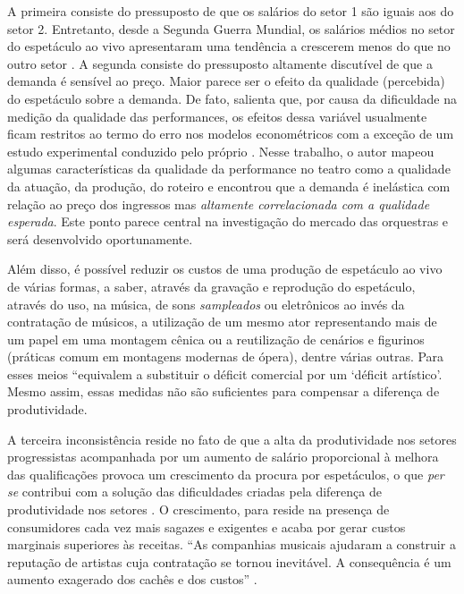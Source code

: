 \documentclass[a4paper, 12pt, openright, oneside, german, french, english, brazil]{abntex2}
\begin{document}
	A primeira consiste do pressuposto de que os salários do setor 1 são iguais aos do setor 2. Entretanto, desde a Segunda Guerra Mundial, os salários médios no setor do espetáculo ao vivo apresentaram uma tendência a crescerem menos do que no outro setor . A segunda consiste do pressuposto altamente discutível de que a demanda é sensível ao preço. Maior parece ser o efeito da qualidade (percebida) do espetáculo sobre a demanda. De fato,  salienta que, por causa da dificuldade na medição da qualidade das performances, os efeitos dessa variável usualmente ficam restritos ao termo do erro nos modelos econométricos com a exceção de um estudo experimental conduzido pelo próprio . Nesse trabalho, o autor mapeou algumas características da qualidade da performance no teatro como a qualidade da atuação, da produção, do roteiro e encontrou que a demanda é inelástica com relação ao preço dos ingressos mas \textit{altamente correlacionada com a qualidade esperada}. Este ponto parece central na investigação do mercado das orquestras e será desenvolvido oportunamente.
	
	Além disso, é possível reduzir os custos de uma produção de espetáculo ao vivo de várias formas, a saber, através da gravação e reprodução do espetáculo, através do uso, na música, de sons \textit{sampleados} ou eletrônicos ao invés da contratação de músicos, a utilização de um mesmo ator representando mais de um papel em uma montagem cênica ou a reutilização de cenários e figurinos (práticas comum em montagens modernas de ópera), dentre várias outras. Para  esses meios ``equivalem a substituir o déficit comercial por um `déficit artístico'. Mesmo assim, essas medidas não são suficientes para compensar a diferença de produtividade. 
	
	A terceira inconsistência reside no fato de que a alta da produtividade nos setores progressistas acompanhada por um aumento de salário proporcional à melhora das qualificações provoca um crescimento da procura por espetáculos, o que \textit{per se} contribui com a solução das dificuldades criadas pela diferença de produtividade nos setores . O crescimento, para  reside na presença de consumidores cada vez mais sagazes e exigentes e acaba por gerar custos marginais superiores às receitas. ``As companhias musicais ajudaram a construir a reputação de artistas cuja contratação se tornou inevitável. A consequência é um aumento exagerado dos cachês e dos custos'' \cite[p. 61]{benhamou2007economia}. 
	
\end{document}
